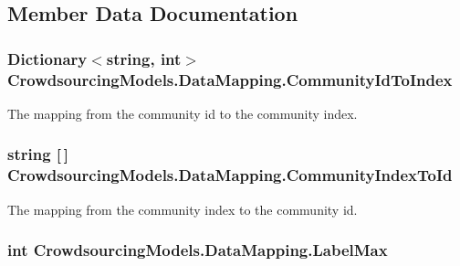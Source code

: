 \subsection{Member Data Documentation}
\hypertarget{class_crowdsourcing_models_1_1_data_mapping_a60781898e954ab8137d6ef1e6546419a}{}
\subsubsection[{Community\+Id\+To\+Index}]{\setlength{\rightskip}{0pt plus 5cm}Dictionary$<$string, int$>$ Crowdsourcing\+Models.\+Data\+Mapping.\+Community\+Id\+To\+Index}\label{class_crowdsourcing_models_1_1_data_mapping_a60781898e954ab8137d6ef1e6546419a}


The mapping from the community id to the community index. 

\hypertarget{class_crowdsourcing_models_1_1_data_mapping_af1db5e9d061b76544cca10847079b102}{}
\subsubsection[{Community\+Index\+To\+Id}]{\setlength{\rightskip}{0pt plus 5cm}string \mbox{[}$\,$\mbox{]} Crowdsourcing\+Models.\+Data\+Mapping.\+Community\+Index\+To\+Id}\label{class_crowdsourcing_models_1_1_data_mapping_af1db5e9d061b76544cca10847079b102}


The mapping from the community index to the community id. 

\hypertarget{class_crowdsourcing_models_1_1_data_mapping_a952ec7abc5b934a2f24ddd333478a4c9}{}
\subsubsection[{Label\+Max}]{\setlength{\rightskip}{0pt plus 5cm}int Crowdsourcing\+Models.\+Data\+Mapping.\+Label\+Max}\label{class_crowdsourcing_models_1_1_data_mapping_a952ec7abc5b934a2f24ddd333478a4c9}


